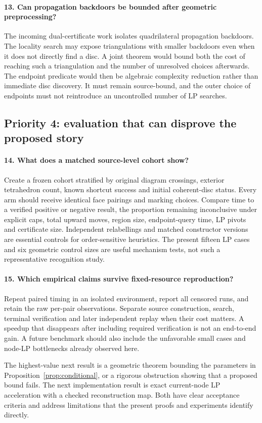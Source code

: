 \paragraph{13. Can propagation backdoors be bounded after geometric preprocessing?}
The incoming dual-certificate work isolates quadrilateral propagation
backdoors. The locality search may expose triangulations with smaller
backdoors even when it does not directly find a disc. A joint theorem
would bound both the cost of reaching such a triangulation and the number
of unresolved choices afterwards. The endpoint predicate would then be
algebraic complexity reduction rather than immediate disc discovery. It
must remain source-bound, and the outer choice of endpoints must not
reintroduce an uncontrolled number of LP searches.

\subsection{Priority 4: evaluation that can disprove the proposed story}

\paragraph{14. What does a matched source-level cohort show?}
Create a frozen cohort stratified by original diagram crossings, exterior
tetrahedron count, known shortcut success and initial coherent-disc status.
Every arm should receive identical face pairings and marking choices.
Compare time to a verified positive or negative result, the proportion
remaining inconclusive under explicit caps, total upward moves, region size,
endpoint-query time, LP pivots and certificate size. Independent relabellings
and matched constructor versions are essential controls for order-sensitive
heuristics. The present fifteen LP cases and six geometric control sizes
are useful mechanism tests, not such a representative recognition study.

\paragraph{15. Which empirical claims survive fixed-resource reproduction?}
Repeat paired timing in an isolated environment, report all censored runs,
and retain the raw per-pair observations. Separate source construction,
search, terminal verification and later independent replay when their cost
matters. A speedup that disappears after including required verification is
not an end-to-end gain. A future benchmark should also include the unfavorable
small cases and node-LP bottlenecks already observed here.

The highest-value next result is a geometric theorem bounding the parameters
in Proposition~\ref{prop:conditional}, or a rigorous obstruction showing
that a proposed bound fails. The next implementation result is exact
current-node LP acceleration with a checked reconstruction map. Both have
clear acceptance criteria and address limitations that the present proofs
and experiments identify directly.
